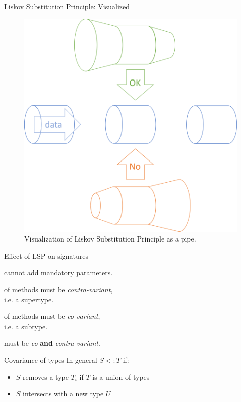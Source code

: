 \documentclass[aspectratio=169]{beamer}
\newcommand{\subtype}{\mathrel{<:}}
\begin{document}
\begin{frame}{Liskov Substitution Principle: Visualized}
    \begin{figure}
    \includegraphics[height=0.75\paperheight]{lsp-pipes.png}
    \caption{
        Visualization of Liskov Substitution Principle as a pipe. \cite{seemann_liskov_2021}
    }
  \end{figure}
\end{frame}
\begin{frame}{Effect of LSP on signatures}
    \begin{description}
        \item[Methods] cannot add mandatory parameters.
        \item[Parameter types] of methods must be \emph{contra-variant},\\i.e. a supertype.
        \item[The return type] of methods must be \emph{co-variant},\\i.e. a subtype.
        \item[Property types] must be \emph{co} \textbf{and} \emph{contra-variant}.
    \end{description}
\end{frame}
\begin{frame}{Covariance of types}
    In general $S \subtype T$ if:
    \begin{itemize}
        \item $S$ removes a type $T_i$ if $T$ is a union of types
        \item $S$ intersects with a new type $U$
    \end{itemize}
\end{frame}
\end{document}
